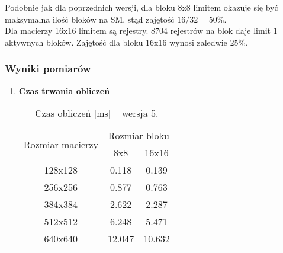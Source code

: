 Podobnie jak dla poprzednich wersji, dla bloku 8x8 limitem okazuje się być maksymalna ilość bloków na SM, stąd zajętość $ 16 / 32 = 50\% $. \\
Dla macierzy 16x16 limitem są rejestry. $8704$ rejestrów na blok daje limit $1$ aktywnych bloków. Zajętość dla bloku 16x16 wynosi zaledwie $ 25\% $. \\

\newpage
\subsubsection{Wyniki pomiarów}

\begin{enumerate}

\item \textbf{Czas trwania obliczeń} \newline

\begin{table}[H]
\centering
\begin{tabular}{|c|c|c|}
\hline
\multirow{2}{*}{Rozmiar macierzy} & \multicolumn{2}{c|}{Rozmiar bloku} \\ \cline{2-3}
& 8x8 & 16x16 \\ \hline
128x128 & 0.118 & 0.139 \\ \hline
256x256 & 0.877 & 0.763 \\ \hline
384x384 & 2.622 & 2.287 \\ \hline
512x512 & 6.248 & 5.471 \\ \hline
640x640 & 12.047 & 10.632 \\ \hline
\end{tabular}
\caption{Czas obliczeń [ms] -- wersja 5.}
\end{table}

\begin{figure}[H]
\centering
\end{figure}
\end{enumerate}
